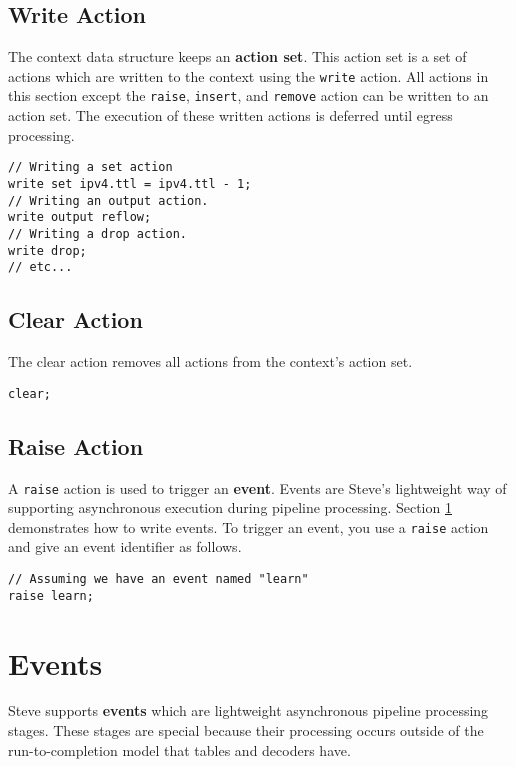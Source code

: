 \subsection{Write Action} \label{write_action_tut}

The context data structure keeps an \textbf{action set}. This action set is a set of actions which are written to the context using the \texttt{write} action. All actions in this section except the \texttt{raise}, \texttt{insert}, and \texttt{remove} action can be written to an action set. The execution of these written actions is deferred until egress processing.

\begin{lstlisting}
// Writing a set action
write set ipv4.ttl = ipv4.ttl - 1;
// Writing an output action.
write output reflow;
// Writing a drop action.
write drop;
// etc...
\end{lstlisting}

\subsection{Clear Action} \label{clear_action_tut}

The clear action removes all actions from the context's action set.

\begin{lstlisting}
clear;
\end{lstlisting}

\subsection{Raise Action} \label{raise_action_tut}

A \texttt{raise} action is used to trigger an \textbf{event}. Events are Steve's lightweight way of supporting asynchronous execution during pipeline processing. Section \ref{event_tut} demonstrates how to write events. To trigger an event, you use a \texttt{raise} action and give an event identifier as follows.

\begin{lstlisting}
// Assuming we have an event named "learn"
raise learn;
\end{lstlisting}

\section{Events} \label{event_tut}

Steve supports \textbf{events} which are lightweight asynchronous pipeline processing stages. These stages are special because their processing occurs outside of the run-to-completion model that tables and decoders have. 

